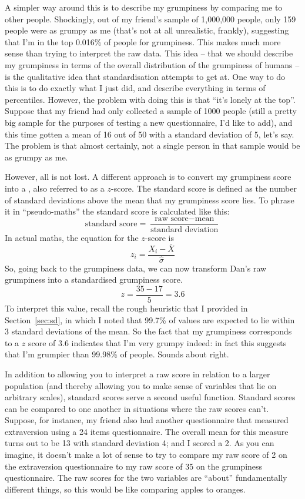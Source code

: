 A simpler way around this is to describe my grumpiness by comparing me to other people. Shockingly, out of my friend's sample of 1,000,000 people, only 159 people were as grumpy as me (that's not at all unrealistic, frankly), suggesting that I'm in the top 0.016\% of people for grumpiness. This makes much more sense than trying to interpret the raw data. This idea -- that we should describe my grumpiness in terms of the overall distribution of the grumpiness of humans -- is the qualitative idea that standardisation attempts to get at. One way to do this is to do exactly what I just did, and describe everything in terms of percentiles. However, the problem with doing this is that ``it's lonely at the top''. Suppose that my friend had only collected a sample of 1000 people (still a pretty big sample for the purposes of testing a new questionnaire, I'd like to add), and this time gotten a mean of 16 out of 50 with a standard deviation of 5, let's say. The problem is that almost certainly, not a single person in that sample would be as grumpy as me.

However, all is not lost. A different approach is to convert my grumpiness score into a , also referred to as a $z$-score. The standard score is defined as the number of standard deviations above the mean that my grumpiness score lies. To phrase it in ``pseudo-maths'' the standard score is calculated like this:
$$
\mbox{standard score} = \frac{\mbox{raw score} - \mbox{mean}}{\mbox{standard deviation}}
$$ 
In actual maths, the equation for the $z$-score is
$$
z_i = \frac{X_i - \bar{X}}{\hat\sigma}
$$
So, going back to the grumpiness data, we can now transform Dan's raw grumpiness into a standardised grumpiness score.
$$
z = \frac{35 - 17}{5} = 3.6
$$
To interpret this value, recall the rough heuristic that I provided in Section~\ref{sec:sd}, in which I noted that 99.7\% of values are expected to lie within 3 standard deviations of the mean. So the fact that my grumpiness corresponds to a $z$ score of 3.6 indicates that I'm very grumpy indeed: in fact this suggests that I'm grumpier than 99.98\% of people. Sounds about right. 

In addition to allowing you to interpret a raw score in relation to a larger population (and thereby allowing you to make sense of variables that lie on arbitrary scales), standard scores serve a second useful function. Standard scores can be compared to one another in situations where the raw scores can't. Suppose, for instance, my friend also had another questionnaire that measured extraversion using a 24 items questionnaire. The overall mean for this measure turns out to be 13 with standard deviation 4; and I scored a 2. As you can imagine, it doesn't make a lot of sense to try to compare my raw score of 2 on the extraversion questionnaire to my raw score of 35 on the grumpiness questionnaire. The raw scores for the two variables are ``about'' fundamentally different things, so this would be like comparing apples to oranges.

